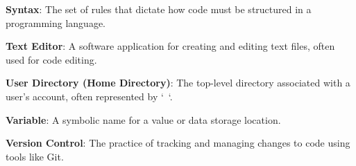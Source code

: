 \documentclass[9pt]{cheatsheet}
\begin{document}
\begin{multicols*}{3}
\textbf{Syntax}: The set of rules that dictate how code must be structured in a programming language.

\textbf{Text Editor}: A software application for creating and editing text files, often used for code editing.

\textbf{User Directory (Home Directory)}: The top-level directory associated with a user's account, often represented by `~`.

\textbf{Variable}: A symbolic name for a value or data storage location.

\textbf{Version Control}: The practice of tracking and managing changes to code using tools like Git.

\vfill


\end{multicols*}
\end{document}
